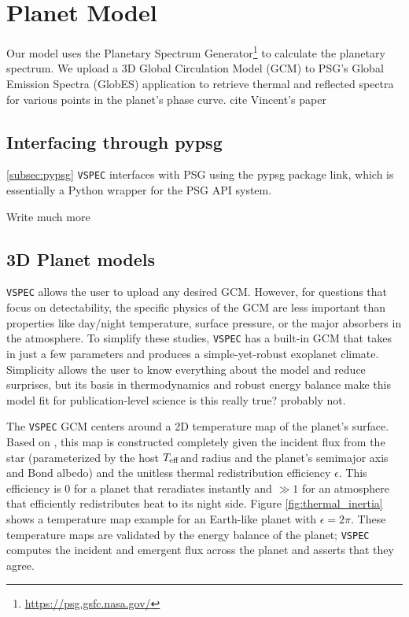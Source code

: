 \documentclass[twocolumn]{aastex631}
\newcommand{\teff}{$T_{\rm eff}$}
\newcommand{\TJ}[1]{\textcolor{tedcommentcolor}{#1}}
\newcommand{\vspec}[1]{\texttt{VSPEC}#1}
\begin{document}
\section{Planet Model \label{sec:pl_model}}
Our model uses the Planetary Spectrum Generator\footnote{\href{https://psg.gsfc.nasa.gov/}{https://psg.gsfc.nasa.gov/}}
\citep[PSG,][]{villanueva2018} to calculate the planetary spectrum. We upload a 3D Global Circulation Model (GCM) to PSG's
Global Emission Spectra (GlobES) application to retrieve thermal and reflected spectra for various points in the planet's phase curve. \TJ{cite Vincent's paper}

\subsection{Interfacing through {\sc pypsg}}
\ref{subsec:pypsg}
\vspec{} interfaces with PSG using the {\sc pypsg} package \TJ{link}, which is essentially a Python wrapper for the PSG API system.

\TJ{Write much more}

\subsection{3D Planet models}
\vspec{} allows the user to upload any desired GCM. However, for questions that focus on detectability,
the specific physics of the GCM are less important than properties like day/night temperature, surface pressure, or
the major absorbers in the atmosphere. To simplify these studies, \vspec{} has a built-in GCM that takes in just a
few parameters and produces a simple-yet-robust exoplanet climate. Simplicity allows the user to know everything about
the model and reduce surprises, but its basis in thermodynamics and robust energy balance make this model fit for publication-level science \TJ{is this really true? probably not}.

The \vspec{} GCM centers around a 2D temperature map of the planet's surface. Based on \citet{cowan2011}, this map
is constructed completely given the incident flux from the star (parameterized by the host \teff and radius
and the planet's semimajor axis and Bond albedo) and the unitless thermal redistribution efficiency $\epsilon$.
This efficiency is 0 for a planet that reradiates instantly and $\gg 1$ for an atmosphere that efficiently redistributes heat to its night side.
Figure \ref{fig:thermal_inertia} shows a temperature map example for an Earth-like planet with $\epsilon = 2\pi$.
These temperature maps are validated by the energy balance of the planet; \vspec{} computes the incident and emergent
flux across the planet and asserts that they agree.
\end{document}
